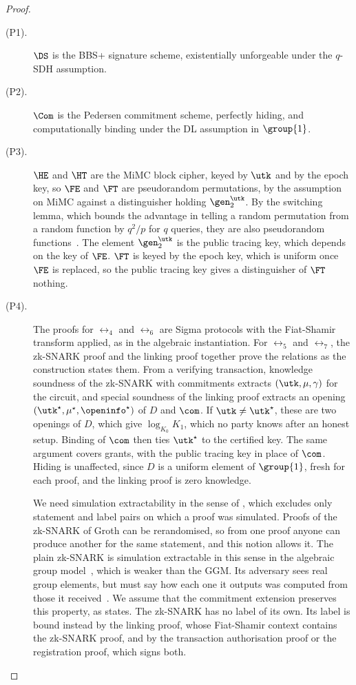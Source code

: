\begin{proof}

\begin{description}

  \item[(P1).] $\DS$ is the BBS+ signature scheme, existentially unforgeable
under the $q$-SDH assumption.

  \item[(P2).] $\Com$ is the Pedersen commitment scheme, perfectly hiding, and
computationally binding under the DL assumption in $\group{1}$.

  \item[(P3).] $\HE$ and $\HT$ are the MiMC block cipher, keyed by $\utk$ and
by the epoch key, so $\FE$ and $\FT$ are pseudorandom permutations, by the assumption
on MiMC against a distinguisher holding $\gen_2^{\utk}$. By the switching
lemma, which bounds the advantage in telling a random permutation from a random
function by $q^2/p$ for $q$ queries, they are also pseudorandom
functions~\cite{EC:BelRog06}. The element $\gen_2^{\utk}$ is the public
tracing key, which depends on the key of $\FE$. $\FT$ is keyed by the epoch key, which is uniform
once $\FE$ is replaced, so the public tracing key gives a distinguisher of $\FT$
nothing.

  \item[(P4).] The proofs for $\rel_4$ and $\rel_6$ are Sigma protocols with
the Fiat-Shamir transform applied, as in the algebraic instantiation. For
$\rel_5$ and $\rel_7$, the zk-SNARK proof and the linking proof together prove
the relations as the construction states them. From a verifying transaction,
knowledge soundness of the zk-SNARK with commitments extracts $(\utk, \mu,
\gamma)$ for the circuit, and special soundness of the linking proof extracts
an opening $(\utk^\star, \mu^\star, \openinfo^\star)$ of $D$ and $\com$. If
$\utk \neq \utk^\star$, these are two openings of $D$, which give $\log_{K_0}
K_1$, which no party knows after an honest setup. Binding of $\com$ then ties
$\utk^\star$ to the certified key. The same argument covers grants, with the
public tracing key in place of $\com$. Hiding is unaffected, since $D$ is a
uniform element of $\group{1}$, fresh for each proof, and the linking proof is
zero knowledge.

  We need simulation extractability in the sense of , which
excludes only statement and label pairs on which a proof was simulated. Proofs
of the zk-SNARK of Groth can be rerandomised, so from one proof anyone can
produce another for the same statement, and this notion allows it. The plain
zk-SNARK is simulation extractable in this sense in the algebraic group
model~\cite{FC:BKSV21}, which is weaker than the GGM. Its adversary sees real
group elements, but must say how each one it outputs was computed from those it
received~\cite{C:FucKilLos18}. We assume that the commitment extension preserves
this property, as  states. The zk-SNARK has no label of its own. Its label is bound instead by the linking
proof, whose Fiat-Shamir context contains the zk-SNARK proof, and by the
transaction authorisation proof or the registration proof, which signs both.


\end{description}
\end{proof}
